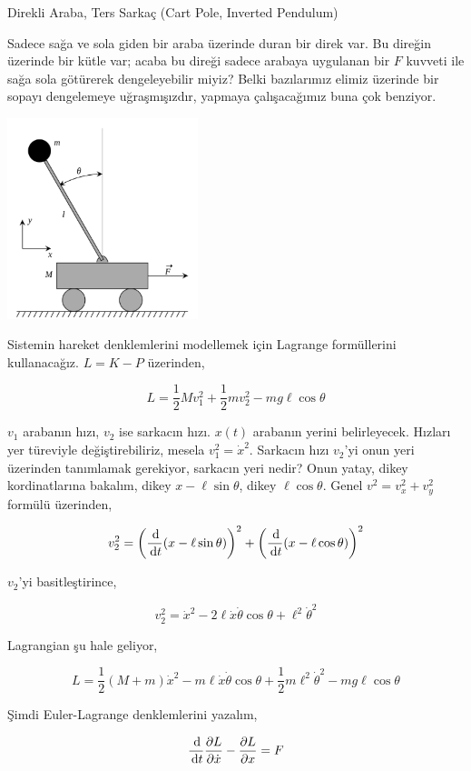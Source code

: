 \documentclass[12pt,fleqn]{article}\usepackage{../../common}
\begin{document}
Direkli Araba, Ters Sarkaç (Cart Pole, Inverted Pendulum)

Sadece sağa ve sola giden bir araba üzerinde duran bir direk var. Bu
direğin üzerinde bir kütle var; acaba bu direği sadece arabaya uygulanan
bir $F$ kuvveti ile sağa sola götürerek dengeleyebilir miyiz? Belki
bazılarımız elimiz üzerinde bir sopayı dengelemeye uğraşmışızdır, yapmaya
çalışacağımız buna çok benziyor.

\includegraphics[width=15em]{phy_cartpole_01.png}

Sistemin hareket denklemlerini modellemek için Lagrange formüllerini
kullanacağız. $L = K - P$ üzerinden,

$$
L = \frac{1}{2} M v_1^2 + \frac{1}{2} m v_2^2 - m g \ell \cos\theta
$$

$v_1$ arabanın hızı, $v_2$ ise sarkacın hızı. $x(t)$ arabanın yerini
belirleyecek. Hızları yer türeviyle değiştirebiliriz, mesela
$v_1^2 = \dot{x}^2$. Sarkacın hızı $v_2$'yi onun yeri üzerinden tanımlamak
gerekiyor, sarkacın yeri nedir? Onun yatay, dikey kordinatlarına bakalım,
dikey $x-\ell\sin\theta$, dikey $\ell\cos\theta$. Genel
$v^2 = v_x^2 + v_y^2$ formülü üzerinden,

$$
v_2^2 = 
\left( \frac{\,\mathrm{d}}{\,\mathrm{d} t} (x - \ell\sin\theta) \right)^2 + 
\left( \frac{\,\mathrm{d}}{\,\mathrm{d} t} (x - \ell\cos\theta) \right)^2 
$$

$v_2$'yi basitleştirince, 

$$
v_2^2 = \dot{x}^2 - 2 \ell \dot{x}\dot{\theta}\cos\theta + \ell^2 \dot{\theta}^2
$$

Lagrangian şu hale geliyor,

$$
L = 
\frac{1}{2} (M + m) \dot{x}^2 - 
m \ell \dot{x}\dot{\theta} \cos\theta +
\frac{1}{2} m \ell^2 \dot{\theta}^2 - 
m g \ell \cos\theta
$$

Şimdi Euler-Lagrange denklemlerini yazalım,

$$
\frac{\,\mathrm{d}}{\,\mathrm{d} t} \frac{\partial L}{\partial \dot{x}} -
\frac{\partial L}{\partial x}  = F
$$
\end{document}
